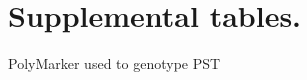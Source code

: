 
\chapter{Supplemental tables.}

\begin{table}
\centering
\caption{PolyMarker used to genotype PST}
\label{app:PolyMarkerPST}
\begin{localsize}{6}{7}

\end{localsize}
\end{table}


\begin{landscape}


\begin{localsize}{6}{7}





\end{localsize}

\end{landscape}



